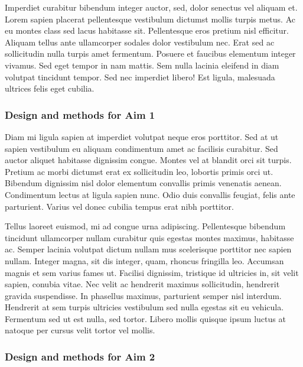 \documentclass[11pt,]{article}
\begin{document}
Imperdiet curabitur bibendum integer auctor, sed, dolor senectus vel
aliquam et. Lorem sapien placerat pellentesque vestibulum dictumst
mollis turpis metus. Ac eu montes class sed lacus habitasse sit.
Pellentesque eros pretium nisl efficitur. Aliquam tellus ante
ullamcorper sodales dolor vestibulum nec. Erat sed ac sollicitudin nulla
turpis amet fermentum. Posuere et faucibus elementum integer vivamus.
Sed eget tempor in nam mattis. Sem nulla lacinia eleifend in diam
volutpat tincidunt tempor. Sed nec imperdiet libero! Est ligula,
malesuada ultrices felis eget cubilia.

\hypertarget{design-and-methods-for-aim-1}{%
\subsubsection{Design and methods for Aim
1}\label{design-and-methods-for-aim-1}}

Diam mi ligula sapien at imperdiet volutpat neque eros porttitor. Sed at
ut sapien vestibulum eu aliquam condimentum amet ac facilisis curabitur.
Sed auctor aliquet habitasse dignissim congue. Montes vel at blandit
orci sit turpis. Pretium ac morbi dictumst erat ex sollicitudin leo,
lobortis primis orci ut. Bibendum dignissim nisl dolor elementum
convallis primis venenatis aenean. Condimentum lectus at ligula sapien
nunc. Odio duis convallis feugiat, felis ante parturient. Varius vel
donec cubilia tempus erat nibh porttitor.

Tellus laoreet euismod, mi ad congue urna adipiscing. Pellentesque
bibendum tincidunt ullamcorper nullam curabitur quis egestas montes
maximus, habitasse ac. Semper lacinia volutpat dictum nullam mus
scelerisque porttitor nec sapien nullam. Integer magna, sit dis integer,
quam, rhoncus fringilla leo. Accumsan magnis et sem varius fames ut.
Facilisi dignissim, tristique id ultricies in, sit velit sapien, conubia
vitae. Nec velit ac hendrerit maximus sollicitudin, hendrerit gravida
suspendisse. In phasellus maximus, parturient semper nisl interdum.
Hendrerit at sem turpis ultricies vestibulum sed nulla egestas sit eu
vehicula. Fermentum sed ut est nulla, sed tortor. Libero mollis quisque
ipsum luctus at natoque per cursus velit tortor vel mollis.

\hypertarget{design-and-methods-for-aim-2}{%
\subsubsection{Design and methods for Aim
2}\label{design-and-methods-for-aim-2}}
\end{document}
